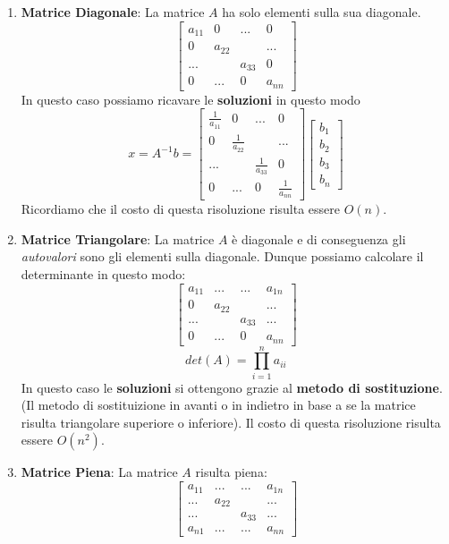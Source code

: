 \documentclass{article}
\begin{document}
\begin{enumerate}
    \item \textbf{Matrice Diagonale}: La matrice $A$ ha solo elementi sulla sua diagonale.
    \[ 
    \begin{bmatrix}
    a_{11} & 0 & ...  & 0\\
    0 & a_{22} &  & ...\\
     ...&  & a_{33} &  0\\
     0& ... & 0 & a_{nn}
    \end{bmatrix} 
    \]
    In questo caso possiamo ricavare le \textbf{soluzioni} in questo modo
    \[ x = A^{-1}b = \begin{bmatrix}
    \frac{1}{a_{11}} & 0 & ...  & 0\\
    0 & \frac{1}{a_{22}} &  & ...\\
     ...&  & \frac{1}{a_{33}} &  0\\
     0& ... & 0 & \frac{1}{a_{nn}}
    \end{bmatrix}
    \begin{bmatrix}
    b_{1}\\    
    b_{2}\\
    b_{3}\\
    b_{n}
    \end{bmatrix}  \]
    Ricordiamo che il costo di questa risoluzione risulta essere $O(n)$.
    \item \textbf{Matrice Triangolare}: La matrice $A$ è diagonale e di conseguenza gli \textit{autovalori} sono gli elementi sulla diagonale. Dunque possiamo calcolare il determinante in questo modo:
    \vspace*{10px}
    \[
    \begin{bmatrix}
    a_{11} & ... & ...  & a_{1n}\\
    0 & a_{22} &  & ...\\
     ...&  & a_{33} &  ...\\
     0 & ... & 0 & a_{nn}
    \end{bmatrix}
    \]
    \vspace*{5px}
    \[ det(A) = \prod_{i=1}^{n} a_{ii} \]
    \vspace*{5px}
    In questo caso le \textbf{soluzioni} si ottengono grazie al \textbf{metodo di sostituzione}. (Il metodo di sostituizione in avanti o in indietro in base a se la matrice risulta triangolare superiore o inferiore). Il costo di questa risoluzione risulta essere $O(n^{2})$.
    \item \textbf{Matrice Piena}: La matrice $A$ risulta piena:
    \[
    \begin{bmatrix}
    a_{11} & ... & ...  & a_{1n}\\
    ... & a_{22} &  & ...\\
     ...&  & a_{33} &  ...\\
     a_{n1} & ... & ... & a_{nn}
    \end{bmatrix}
    \]


\end{enumerate}
\end{document}
